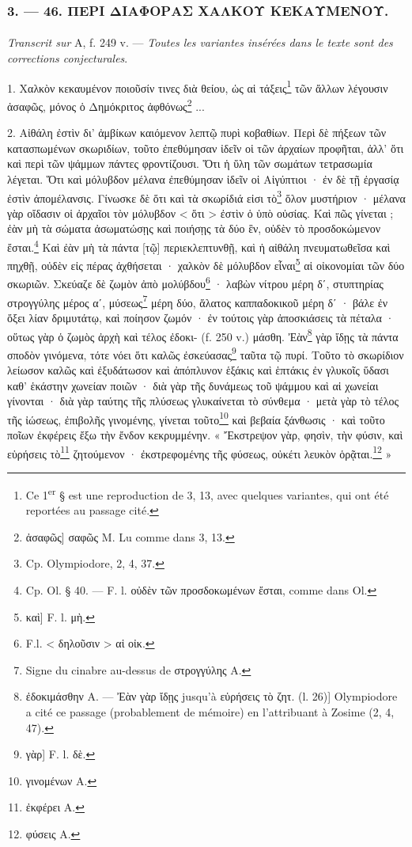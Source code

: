 \documentclass[landscape, a4paper, 11pt, oneside, polutonikogreek, french]{article}
\begin{document}
\bigskip
\centerline{\EightStarTaper}
\centerline{\EightStarTaper\EightStarTaper}
\bigskip

\subsubsection{3. --- 46. ΠΕΡΙ ΔΙΑΦΟΡΑΣ ΧΑΛΚΟΥ ΚΕΚΑΥΜΕΝΟΥ.}
\paragraph{}
\emph{Transcrit sur} A, f. 249 v. --- \emph{Toutes les variantes insérées dans le texte sont des corrections conjecturales}.

\bigskip

1. Χαλκὸν κεκαυμένον ποιοῦσίν τινες διὰ θείου, ὡς αἱ τάξεις\footnote{Ce 1\textsuperscript{er} § est une reproduction de 3, 13, avec quelques variantes, qui ont été reportées au passage cité.} τῶν ἄλλων λέγουσιν ἀσαφῶς, μόνος ὁ Δημόκριτος ἀφθόνως\footnote{ἀσαφῶς] σαφῶς M. Lu comme dans 3, 13.} ...

2. Αἰθάλη ἐστὶν δι' ἀμβίκων καιόμενον λεπτῷ πυρὶ κοβαθίων. Περὶ δὲ πήξεων τῶν κατασπωμένων σκωριδίων, τοῦτο ἐπεθύμησαν ἰδεῖν οἱ τῶν ἀρχαίων προφῆται, ἀλλ' ὅτι καὶ περὶ τῶν ψάμμων πάντες φροντίζουσι. Ὅτι ἡ ὕλη τῶν σωμάτων τετρασωμία λέγεται. Ὅτι καὶ μόλυβδον μέλανα ἐπεθύμησαν ἰδεῖν οἱ Αἰγύπτιοι · ἐν δὲ τῇ ἐργασίᾳ ἐστὶν ἀπομέλανσις. Γίνωσκε δὲ ὅτι καὶ τὰ σκωρίδιά εἰσι τὸ\footnote{Cp. Olympiodore, 2, 4, 37.} ὅλον μυστήριον · μέλανα γὰρ οἴδασιν οἱ ἀρχαῖοι τὸν μόλυβδον < ὅτι > ἐστὶν ὁ ὑπὸ οὐσίας. Καὶ πῶς γίνεται ; ἐὰν μὴ τὰ σώματα ἀσωματώσῃς καὶ ποιήσῃς τὰ δύο ἓν, οὐδὲν τὸ προσδοκώμενον ἔσται.\footnote{Cp. Ol. § 40. --- F. l. οὐδὲν τῶν προσδοκωμένων ἔσται, comme dans Ol.} Καὶ ἐὰν μὴ τὰ πάντα [τῷ] περιεκλεπτυνθῇ, καὶ ἡ αἰθάλη πνευματωθεῖσα καὶ πηχθῇ, οὐδὲν εἰς πέρας ἀχθήσεται · χαλκὸν δὲ μόλυβδον εἶναι\footnote{καὶ] F. l. μὴ.} αἱ οἰκονομίαι τῶν δύο σκωριῶν. Σκεύαζε δὲ ζωμὸν ἀπὸ μολύβδου\footnote{F.l. < δηλοῦσιν > αἱ οἰκ.} · λαβὼν νίτρου μέρη δʹ, στυπτηρίας στρογγύλης μέρος αʹ, μύσεως\footnote{Signe du cinabre au-dessus de στρογγύλης A.} μέρη δύο, ἅλατος καππαδοκικοῦ μέρη δʹ · βάλε ἐν ὄξει λίαν δριμυτάτῳ, καὶ ποίησον ζωμόν · ἐν τούτοις γὰρ ἀποσκιάσεις τὰ πέταλα · οὕτως γὰρ ὁ ζωμὸς ἀρχὴ καὶ τέλος ἐδοκι- (f. 250 v.) μάσθη. Ἐὰν\footnote{ἐδοκιμάσθην A. --- Ἐὰν γὰρ ἴδῃς jusqu'à εὑρήσεις τὸ ζητ. (l. 26)] Olympiodore a cité ce passage (probablement de mémoire) en l'attribuant à Zosime (2, 4, 47).} γὰρ ἴδῃς τὰ πάντα σποδὸν γινόμενα, τότε νόει ὅτι καλῶς ἐσκεύασας\footnote{γὰρ] F. l. δὲ.} ταῦτα τῷ πυρί. Τοῦτο τὸ σκωρίδιον λείωσον καλῶς καὶ ἐξυδάτωσον καὶ ἀπόπλυνον ἑξάκις καὶ ἑπτάκις ἐν γλυκοῖς ὕδασι καθ' ἑκάστην χωνείαν ποιῶν · διὰ γὰρ τῆς δυνάμεως τοῦ ψάμμου καὶ αἱ χωνείαι γίνονται · διὰ γὰρ ταύτης τῆς πλύσεως γλυκαίνεται τὸ σύνθεμα · μετὰ γὰρ τὸ τέλος τῆς ἰώσεως, ἐπιβολῆς γινομένης, γίνεται τοῦτο\footnote{γινομένων A.} καὶ βεβαία ξάνθωσις · καὶ τοῦτο ποῖων ἐκφέρεις ἔξω τὴν ἔνδον κεκρυμμένην. « Ἔκστρεψον γὰρ, φησὶν, τὴν φύσιν, καὶ εὑρήσεις τὸ\footnote{ἐκφέρει A.} ζητούμενον · ἐκστρεφομένης τῆς φύσεως, οὐκέτι λευκὸν ὁρᾷται.\footnote{φύσεις A.} »
\end{document}
